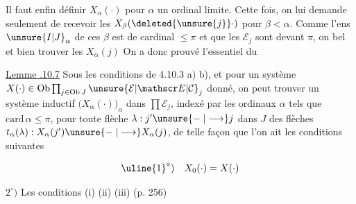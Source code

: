 Il faut enfin définir $X_\alpha(\cdot)$ pour $\alpha$ un ordinal limite. Cette fois, on lui demande seulement de recevoir les $X_\beta(\deleted{\unsure{j}}\cdot)$ pour $\beta<\alpha$. Comme l'ens $\unsure{I|J}_\alpha$ de ces $\beta$ est de cardinal $\leq\pi$ et que les $\mathcal E_j$ sont  devant $\pi$, on  bel et bien trouver les $X_\alpha(j)$
On a donc prouvé l'essentiel du

\uline{Lemme .10.7} Sous les conditions de 4.10.3 a) b), et pour un système $X(\cdot)\in\operatorname{Ob}\prod_{j\in\operatorname{Ob}J}\unsure{\mathcal E|\mathscr E|\mathcal C}_j$ donné, on peut trouver un système inductif $\bigl(X_\alpha(\cdot)\bigr)_\alpha$ dans $\prod\mathcal E_j$, indexé par les ordinaux $\alpha$ tels que $\mathrm{card}\,\alpha\leq\pi$,  pour toute flèche $\lambda:j'\unsure{\mathrel{-}|\longrightarrow}j$ dans $J$  des flèches $t_\alpha(\lambda):X_\alpha(j')\unsure{\mathrel{-}|\longrightarrow}X_\alpha(j)$, de telle façon que l'on ait les conditions suivantes

\[
 \uline{1}^{\circ})\quad X_0(\cdot)=X(\cdot)
\]

$2^\circ)$ Les conditions (i) (ii) (iii) (p. 256)

